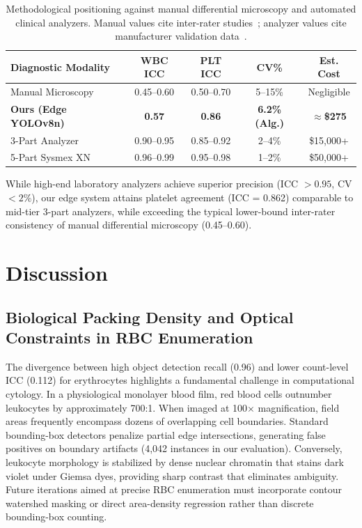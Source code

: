 \documentclass[10pt,conference]{IEEEtran}
\begin{document}
\begin{table}[!t]
\centering
\caption{Methodological positioning against manual differential microscopy and automated clinical analyzers. Manual values cite inter-rater studies~\cite{rumke1985}; analyzer values cite manufacturer validation data~\cite{sysmex2020, horiba2022}.}
\label{tab:analyzer_compare}
\setlength{\tabcolsep}{2.2pt}
\renewcommand{\arraystretch}{1.1}
\begin{tabular}{lcccc}
\toprule
\textbf{Diagnostic Modality} & \textbf{WBC ICC} & \textbf{PLT ICC} & \textbf{CV\%} & \textbf{Est. Cost} \\
\midrule
Manual Microscopy~\cite{rumke1985} & 0.45--0.60 & 0.50--0.70 & 5--15\% & Negligible \\
\textbf{Ours (Edge YOLOv8n)} & \textbf{0.57} & \textbf{0.86} & \textbf{6.2\% (Alg.)} & \textbf{$\approx$\$275} \\
3-Part Analyzer~\cite{who2011} & 0.90--0.95 & 0.85--0.92 & 2--4\% & \$15,000+ \\
5-Part Sysmex XN~\cite{sysmex2020} & 0.96--0.99 & 0.95--0.98 & 1--2\% & \$50,000+ \\
\bottomrule
\end{tabular}
\end{table}

While high-end laboratory analyzers achieve superior precision (ICC $> 0.95$, CV $< 2\%$), our edge system attains platelet agreement (ICC = 0.862) comparable to mid-tier 3-part analyzers, while exceeding the typical lower-bound inter-rater consistency of manual differential microscopy (0.45–0.60).

\section{Discussion}
\label{sec:discussion}

\subsection{Biological Packing Density and Optical Constraints in RBC Enumeration}
The divergence between high object detection recall (0.96) and lower count-level ICC (0.112) for erythrocytes highlights a fundamental challenge in computational cytology. In a physiological monolayer blood film, red blood cells outnumber leukocytes by approximately 700:1. When imaged at 100$\times$ magnification, field areas frequently encompass dozens of overlapping cell boundaries. Standard bounding-box detectors penalize partial edge intersections, generating false positives on boundary artifacts (4,042 instances in our evaluation). Conversely, leukocyte morphology is stabilized by dense nuclear chromatin that stains dark violet under Giemsa dyes, providing sharp contrast that eliminates ambiguity. Future iterations aimed at precise RBC enumeration must incorporate contour watershed masking or direct area-density regression rather than discrete bounding-box counting.
\end{document}
